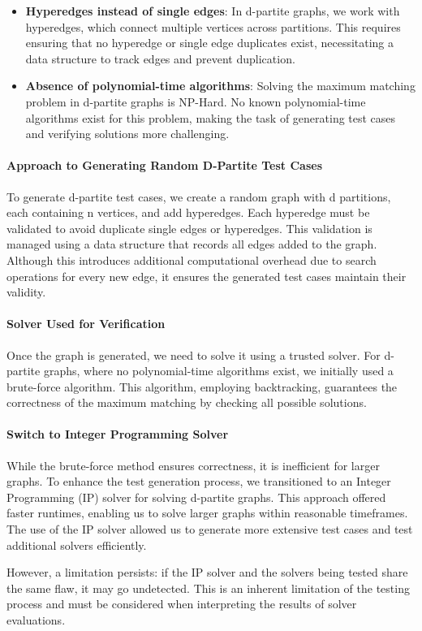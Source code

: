\begin{itemize}
    \item \textbf{Hyperedges instead of single edges}: In d-partite graphs, we work with hyperedges, which connect multiple vertices across partitions. This requires ensuring that no hyperedge or single edge duplicates exist, necessitating a data structure to track edges and prevent duplication.
    \item \textbf{Absence of polynomial-time algorithms}: Solving the maximum matching problem in d-partite graphs is NP-Hard. No known polynomial-time algorithms exist for this problem, making the task of generating test cases and verifying solutions more challenging.
\end{itemize}

\paragraph{Approach to Generating Random D-Partite Test Cases}
To generate d-partite test cases, we create a random graph with d partitions, each containing n vertices, and add hyperedges. Each hyperedge must be validated to avoid duplicate single edges or hyperedges. This validation is managed using a data structure that records all edges added to the graph. Although this introduces additional computational overhead due to search operations for every new edge, it ensures the generated test cases maintain their validity.

\paragraph{Solver Used for Verification}
Once the graph is generated, we need to solve it using a trusted solver. For d-partite graphs, where no polynomial-time algorithms exist, we initially used a brute-force algorithm. This algorithm, employing backtracking, guarantees the correctness of the maximum matching by checking all possible solutions.

\paragraph{Switch to Integer Programming Solver}
While the brute-force method ensures correctness, it is inefficient for larger graphs. To enhance the test generation process, we transitioned to an Integer Programming (IP) solver for solving d-partite graphs. This approach offered faster runtimes, enabling us to solve larger graphs within reasonable timeframes. The use of the IP solver allowed us to generate more extensive test cases and test additional solvers efficiently.

However, a limitation persists: if the IP solver and the solvers being tested share the same flaw, it may go undetected. This is an inherent limitation of the testing process and must be considered when interpreting the results of solver evaluations.